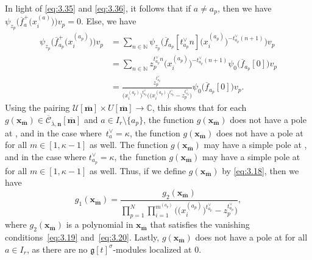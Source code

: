 \documentclass[pdftex]{sigma}
\numberwithin{equation}{section}
\begin{document}
\begin{enumerate}
\begin{equation*}
\end{equation*}
In light of \eqref{eq:3.35} and \eqref{eq:3.36}, it follows that if $a\neq a_p$, then we have $\psi_{z_p}\bigl(\overline{ f}_a^+\bigl(x_i^{(a)}\bigr)\bigr)v_p=0$. Else, we have
\begin{align}
\psi_{z_p}\bigl(\overline{f}_{a_p}^+\bigl(x_i^{(a_p)}\bigr)\bigr)v_p
&=\sum_{n\in\mathbb{N}}\psi_{z_p}\bigl(\overline{f}_{a_p}[t_{a_p}^{\vee}n]\bigl(x_i^{(a_p)}\bigr)^{-t_{a_p}^{\vee}(n+1)}\bigr)v_p\nonumber\\
&=\sum_{n\in\mathbb{N}}z_p^{t_{a_p}^{\vee}n}\bigl(x_i^{(a_p)}\bigr)^{-t_{a_p}^{\vee}(n+1)}\psi_0\bigl(\overline{f}_{a_p}[0]\bigr)v_p\nonumber\\
&=\frac{z_p^{t_{a_p}^{\vee}}}{\bigl(x_i^{(a_p)}\bigr)^{t_{a_p}^{\vee}}\bigl(\bigl(x_i^{(a_p)}\bigr)^{t_{a_p}^{\vee}}-z_p^{t_{a_p}^{\vee}}\bigr)}\psi_0\bigl( \overline{f}_{a_p}[0]\bigr)v_p.\label{eq:3.37}
\end{align}
Using the pairing $\mathcal{U}[\overline{\mathbf{m}}]\times U[\overline{\mathbf{m}}]\to\mathbb{C}$, this shows that for each $g(\mathbf{x}_{\overline{\mathbf{m}}})\in\overline{ \mathcal{C}}_{\overline{\lambda},\mathbf{n}}[\overline{ \mathbf{m}}]$ and $a\in I_r\setminus\{a_p\}$, the function $g(\mathbf{x}_{\overline{\mathbf{m}}})$ does not have a pole at , and in the case where~${t_a^{\vee}= \kappa}$, the function $g(\mathbf{x}_{\overline{\mathbf{m}}})$ does not have a pole at  for all $m\in[1,\kappa-1]$ as well. The function $g(\mathbf{x}_{ \overline{\mathbf{m}}})$ may have a simple pole at , and in the case where $t_{a_p}^{\vee}= \kappa$, the~function $g(\mathbf{x}_{\overline{\mathbf{ m}}})$ may have a simple pole at  for all $m\in[1,\kappa-1]$ as well. Thus, if we define $g(\mathbf{x}_{\overline{\mathbf{m}}})$ by \eqref{eq:3.18}, then we have
\begin{equation}\label{eq:3.38}
g_1(\mathbf{x}_{\overline{\mathbf{m}}})
=\frac{g_2(\mathbf{x}_{\overline{\mathbf{m}}})}{  \prod_{p=1}^N\prod_{i=1}^{m^{(a_p)}}\bigl(\bigl(x_i^{(a_p)}\bigr)^{t_{a_p} ^{\vee}}-z_p^{t_{a_p}^{\vee}}\bigr)},
\end{equation}
where $g_2(\mathbf{x}_{\overline{\mathbf{m}}})$ is a polynomial in $\mathbf{x}_{\overline{\mathbf{m}}}$ that satisfies the vanishing conditions~\eqref{eq:3.19} and~\eqref{eq:3.20}. Lastly, $g(\mathbf{x}_{\overline{ \mathbf{m}}})$ does not have a pole at  for all $a\in I_r$, as there are no $\mathfrak{g}[t]^{\sigma}$-modules localized at $0$.

\end{enumerate}
\end{document}
